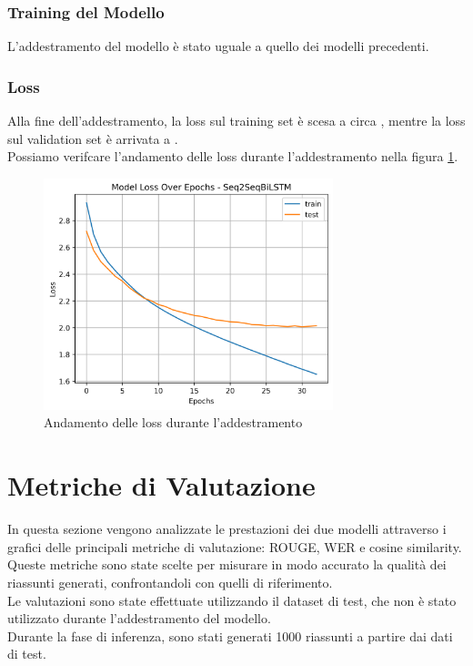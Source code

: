 \documentclass[a4paper, 12pt]{article}
\begin{document}
\subsubsection{Training del Modello}
L'addestramento del modello è stato uguale a quello dei modelli precedenti.\\

\subsubsection{Loss}
Alla fine dell'addestramento, la loss sul training set è scesa a circa , mentre la loss sul validation set è arrivata a .\\
Possiamo verifcare l'andamento delle loss durante l'addestramento nella figura \ref{fig:seq2seq3bilstm_loss_plot}.

\begin{figure}[H]
    \centering
    \includegraphics[width=0.75\textwidth]{media/Seq2Seq3BiLSTM_originale_lossplot.png}
    \caption{Andamento delle loss durante l'addestramento}
    \label{fig:seq2seq3bilstm_loss_plot}
\end{figure}

\section{Metriche di Valutazione}
In questa sezione vengono analizzate le prestazioni dei due modelli attraverso i grafici delle principali metriche di valutazione: ROUGE, WER e cosine similarity. 
Queste metriche sono state scelte per misurare in modo accurato la qualità dei riassunti generati, confrontandoli con quelli di riferimento.\\
Le valutazioni sono state effettuate utilizzando il dataset di test, che non è stato utilizzato durante l'addestramento del modello.\\
Durante la fase di inferenza, sono stati generati 1000 riassunti a partire dai dati di test.
\end{document}
